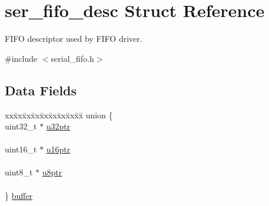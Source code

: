 \hypertarget{structser__fifo__desc}{}\section{ser\+\_\+fifo\+\_\+desc Struct Reference}
\label{structser__fifo__desc}


F\+I\+FO descriptor used by F\+I\+FO driver.  




{\ttfamily \#include $<$serial\+\_\+fifo.\+h$>$}

\subsection*{Data Fields}
\begin{DoxyCompactItemize}
\item 
\begin{tabbing}
xx\=xx\=xx\=xx\=xx\=xx\=xx\=xx\=xx\=\kill
union \{\\
\>uint32\_t $\ast$ \mbox{\hyperlink{group__fifo__group_ga00500224ac165192ac888251a076606d}{u32ptr}}\\
\>\\
\>uint16\_t $\ast$ \mbox{\hyperlink{group__fifo__group_ga15c8362aa58f36ae5de7f6180550d6b5}{u16ptr}}\\
\>\\
\>uint8\_t $\ast$ \mbox{\hyperlink{group__fifo__group_gacc04e057a962c975bbdf62664c52ff2c}{u8ptr}}\\
\>\\
\} \mbox{\hyperlink{group__fifo__group_ga83d6d4f3680146b2fed2c6cd33da9d59}{buffer}}\\


\end{tabbing}
\end{DoxyCompactItemize}
